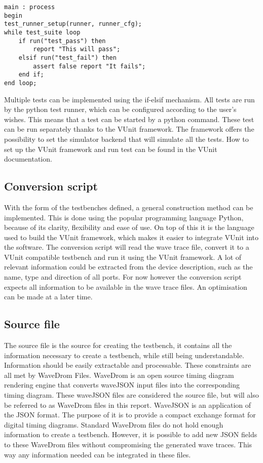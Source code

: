 \begin{lstlisting}[style=vhdl, caption={Main test loop for a VUnit testbench}]
main : process
begin
test_runner_setup(runner, runner_cfg);
while test_suite loop
	if run("test_pass") then
		report "This will pass";
	elsif run("test_fail") then
		assert false report "It fails";
	end if;
end loop;
\end{lstlisting}\noindent
Multiple tests can be implemented using the if-elsif mechanism. All tests are run by the python test runner, which can be configured according to the user's wishes. This means that a test can be started by a python command. These test can be run separately thanks to the VUnit framework. The framework offers the possibility to set the simulator backend that will simulate all the tests. How to set up the VUnit framework and run test can be found in the VUnit documentation.
\subsection{Conversion script}
With the form of the testbenches defined, a general construction method can be implemented. This is done using the popular programming language Python, because of its clarity, flexibility and ease of use. On top of this it is the language used to build the VUnit framework, which makes it easier to integrate VUnit into the software.
\npar
The conversion script will read the wave trace file, convert it to a VUnit compatible testbench and run it using the VUnit framework.
\npar
A lot of relevant information could be extracted from the device description, such as the name, type and direction of all ports. For now however the conversion script expects all information to be available in the wave trace files. An optimisation can be made at a later time.
\subsection{Source file}
The source file is the source for creating the testbench, it contains all the information necessary to create a testbench, while still being understandable. Information should be easily extractable and processable. These constraints are all met by WaveDrom Files.
\npar
WaveDrom is an open source timing diagram rendering engine that converts waveJSON input files into the corresponding timing diagram. These waveJSON files are considered the source file, but will also be referred to as WaveDrom files in this report.
\npar
WaveJSON \cite{wavejson} is an application of the JSON format. The purpose of it is to provide a compact exchange format for digital timing diagrams.
\npar
Standard WaveDrom files do not hold enough information to create a testbench. However, it is possible to add new JSON fields to these WaveDrom files without compromising the generated wave traces. This way any information needed can be integrated in these files.
